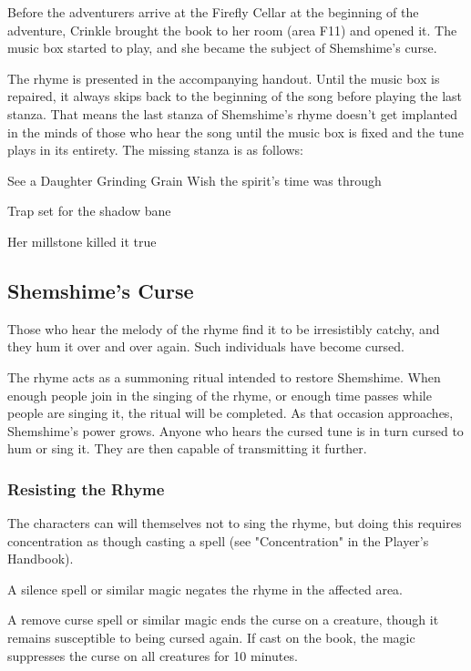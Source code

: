 \documentclass[10pt,a4paper,twoside,bg=print,twocolumn,openany,nodeprecatedcode]{dndbook}
\begin{document}
Before the adventurers arrive at the Firefly Cellar at the beginning of the adventure, Crinkle brought the book to her room (area F11) and opened it. The music box started to play, and she became the subject of Shemshime's curse.

The rhyme is presented in the accompanying handout. Until the music box is repaired, it always skips back to the beginning of the song before playing the last stanza. That means the last stanza of Shemshime's rhyme doesn't get implanted in the minds of those who hear the song until the music box is fixed and the tune plays in its entirety. The missing stanza is as follows:

\begin{DndReadAloud}{See a Daughter Grinding Grain}
Wish the spirit's time was through

Trap set for the shadow bane

Her millstone killed it true

\end{DndReadAloud}

\subsection{Shemshime's Curse}
Those who hear the melody of the rhyme find it to be irresistibly catchy, and they hum it over and over again. Such individuals have become cursed.

The rhyme acts as a summoning ritual intended to restore Shemshime. When enough people join in the singing of the rhyme, or enough time passes while people are singing it, the ritual will be completed. As that occasion approaches, Shemshime's power grows. Anyone who hears the cursed tune is in turn cursed to hum or sing it. They are then capable of transmitting it further.

\subsubsection{Resisting the Rhyme}
The characters can will themselves not to sing the rhyme, but doing this requires concentration as though casting a spell (see "Concentration" in the Player's Handbook).

A silence spell or similar magic negates the rhyme in the affected area.

A remove curse spell or similar magic ends the curse on a creature, though it remains susceptible to being cursed again. If cast on the book, the magic suppresses the curse on all creatures for 10 minutes.
\end{document}
